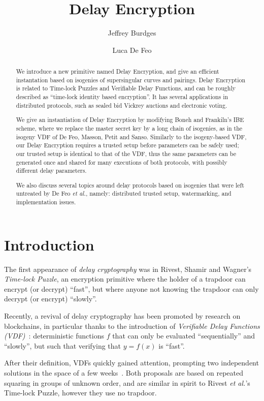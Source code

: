 \documentclass{llncs}
\title{Delay Encryption}
\author{Jeffrey Burdges\inst{1}
  \and
  Luca De Feo\inst{2}\orcidID{0000-0002-9321-0773}}
\institute{
  Web 3, Switzerland
  \and
  IBM Research Zürich, Switzerland
}
\begin{document}
\maketitle

\begin{abstract}
  We introduce a new primitive named Delay Encryption, and give an
  efficient instantation based on isogenies of supersingular curves
  and pairings. %
  Delay Encryption is related to Time-lock Puzzles and Verifiable
  Delay Functions, and can be roughly described as ``time-lock
  identity based encryption''. %
  It has several applications in distributed protocols, such as
  sealed bid Vickrey auctions and electronic voting.

  We give an instantiation of Delay Encryption by modifying Boneh and
  Frankiln's IBE scheme, where we replace the master secret key by a
  long chain of isogenies, as in the isogeny VDF of De Feo, Masson, 
  Petit and Sanso. %
  Similarly to the isogeny-based VDF, our Delay Encryption requires a
  trusted setup before parameters can be safely used; our trusted
  setup is identical to that of the VDF, thus the same parameters can
  be generated once and shared for many executions of both protocols,
  with possibly different delay parameters.

  We also discuss several topics around delay protocols
  based on isogenies that were left untreated by De Feo \emph{et al.},
  namely: distributed trusted setup, watermarking, and implementation
  issues.
\end{abstract}

\section{Introduction}
\label{sec:introduction}

The first appearance of \emph{delay cryptography} was in Rivest,
Shamir and Wagner's~\cite{TLP} \emph{Time-lock Puzzle}, an encryption
primitive where the holder of a trapdoor can encrypt (or decrypt)
``fast'', but where anyone not knowing the trapdoor can only decrypt
(or encrypt) ``slowly''.

Recently, a revival of delay cryptography has been promoted by
research on blockchains, in particular thanks to the introduction of
\emph{Verifiable Delay Functions (VDF)}~\cite{Boneh}: deterministic
functions $f$ that can only be evaluated  ``sequentially'' and ``slowly'',
but such that verifying that $y=f(x)$ is ``fast''. %

After their definition, VDFs quickly gained attention, prompting two
independent solutions in the space of a few
weeks~\cite{Wesolowski,Pietrzak}. %
Both proposals are based on repeated squaring in groups of unknown
order, and are similar in spirit to Rivest \emph{et al.}'s Time-lock
Puzzle, however they use no trapdoor.
\end{document}
